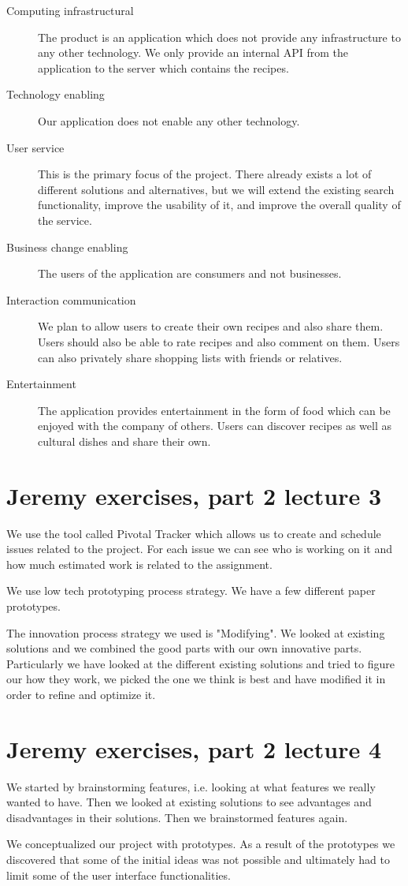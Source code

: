\begin{description}
\item[Computing infrastructural] The product is an application which does not provide any infrastructure to any other technology. We only provide an internal API from the application to the server which contains the recipes.
\item[Technology enabling] Our application does not enable any other technology.
\item[User service] This is the primary focus of the project. There already exists a lot of different solutions and alternatives, but we will extend the existing search functionality, improve the usability of it, and improve the overall quality of the service.
\item[Business change enabling] The users of the application are consumers and not businesses.
\item[Interaction communication] We plan to allow users to create their own recipes and also share them. Users should also be able to rate recipes and also comment on them. Users can also privately share shopping lists with friends or relatives.
\item[Entertainment] The application provides entertainment in the form of food which can be enjoyed with the company of others. Users can discover recipes as well as cultural dishes and share their own.
\end{description}

\section*{Jeremy exercises, part 2 lecture 3}

We use the tool called Pivotal Tracker which allows us to create and schedule issues related to the project. For each issue we can see who is working on it and how much estimated work is related to the assignment.

We use low tech prototyping process strategy. We have a few different paper prototypes.

The innovation process strategy we used is "Modifying". We looked at existing solutions and we combined the good parts with our own innovative parts. Particularly we have looked at the different existing solutions and tried to figure our how they work, we picked the one we think is best and have modified it in order to refine and optimize it.

\section*{Jeremy exercises, part 2 lecture 4}

We started by brainstorming features, i.e. looking at what features we really wanted to have. Then we looked at existing solutions to see advantages and disadvantages in their solutions. Then we brainstormed features again.


We conceptualized our project with prototypes. As a result of the prototypes we discovered that some of the initial ideas was not possible and ultimately had to limit some of the user interface functionalities.

